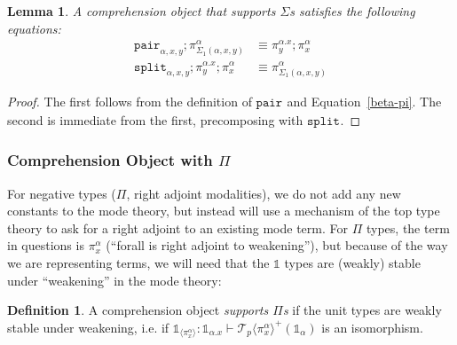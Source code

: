 \documentclass[10pt]{article}
\newtheorem{lemma}{Lemma}
\theoremstyle{definition}
\newtheorem{definition}{Definition}
\newcommand{\id}{\mathsf{id}}
\newcommand\TrPlus[2]{\ensuremath{{#1}^+(#2)}}
\newcommand\ApEl[2]{\mathcal{T}_{#1}\langle#2\rangle}
\newcommand\bdot[0]{\mathbin{.}}
\newcommand\ApPlus[2]{\ensuremath{{#1}^+ \langle #2 \rangle }}
\newcommand{\tdot}{\ensuremath{\mathtt{dot}}}
\newcommand\One{\ensuremath{\mathds{1}}}
\newcommand\ApOne[1]{\ensuremath{\One_{\langle {#1} \rangle }}}
\newcommand\contract[1]{\ensuremath{\mathtt{contract}_{#1}}}
\newcommand\fibpair[1]{\ensuremath{\mathtt{fibpair}_{#1}}}
\newcommand\pair[1]{\ensuremath{\mathtt{pair}_{#1}}}
\newcommand\tsplit[1]{\ensuremath{\mathtt{split}_{#1}}}
\begin{document}

\begin{lemma}
A comprehension object that supports $\Sigma$s satisfies the following equations:
\begin{align}
\pair{\alpha,x,y};\pi^\alpha_{\Sigma_1(\alpha, x, y)} &\equiv \pi^{\alpha.x}_y;\pi^\alpha_x \\
\tsplit{\alpha,x,y};\pi^{\alpha.x}_y;\pi^\alpha_x &\equiv \pi^\alpha_{\Sigma_1(\alpha, x, y)} %
\end{align}
\end{lemma}
\begin{proof}
The first follows from the definition of $\pair{}$ and Equation~\ref{beta-pi}. The second is immediate from the first, precomposing with $\tsplit{}$. 
\end{proof}

\subsubsection{Comprehension Object with $\Pi$}

For negative types ($\Pi$, right adjoint modalities), we do not add any
new constants to the mode theory, but instead will use a mechanism of
the top type theory to ask for a right adjoint to an existing mode
term.  For $\Pi$ types, the term in questions is $\pi^\alpha_x$
(``forall is right adjoint to weakening''), but because of the way we
are representing terms, we will need that the $\One$ types are (weakly)
stable under ``weakening'' in the mode theory: 

\begin{definition}\label{def:supports-pis}
  A comprehension object \emph{supports $\Pi$s} if
  the unit types are weakly stable under weakening, i.e.
  if 
  $\ApOne{\pi^\alpha_x} :
\One_{\alpha.x} \vdash \TrPlus{\ApEl p {\pi^\alpha_x}}{\One_\alpha}$ is an
isomorphism.
\end{definition}
\end{document}
